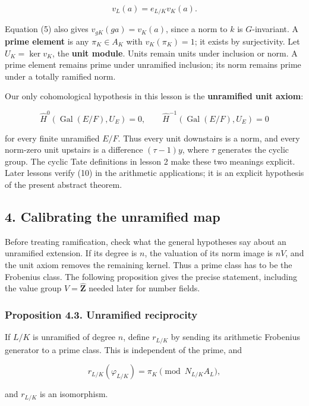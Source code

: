 \documentclass[11pt,a4paper]{article}
\begin{document}
\[
v_L(a)=e_{L/K}v_K(a).
\tag{9}
\]

Equation (5) also gives \(v_{gK}(ga)=v_K(a)\), since a norm to \(k\) is
\(G\)-invariant. A \textbf{prime element} is any \(\pi_K\in A_K\) with
\(v_K(\pi_K)=1\); it exists by surjectivity. Let \(U_K=\ker v_K\), the
\textbf{unit module}. Units remain units under inclusion or norm. A
prime element remains prime under unramified inclusion; its norm remains
prime under a totally ramified norm.

Our only cohomological hypothesis in this lesson is the
\textbf{unramified unit axiom}:

\[
\widehat H^0(\operatorname{Gal}(E/F),U_E)=0,
\qquad
\widehat H^{-1}(\operatorname{Gal}(E/F),U_E)=0
\tag{10}
\]

for every finite unramified \(E/F\). Thus every unit downstairs is a
norm, and every norm-zero unit upstairs is a difference \((\tau-1)y\),
where \(\tau\) generates the cyclic group. The cyclic Tate definitions
in lesson 2 make these two meanings explicit. Later lessons verify (10)
in the arithmetic applications; it is an explicit hypothesis of the
present abstract theorem.

\subsection{4. Calibrating the unramified
map}\label{calibrating-the-unramified-map}

Before treating ramification, check what the general hypotheses say
about an unramified extension. If its degree is \(n\), the valuation of
its norm image is \(nV\), and the unit axiom removes the remaining
kernel. Thus a prime class has to be the Frobenius class. The following
proposition gives the precise statement, including the value group
\(V=\widehat{\mathbf Z}\) needed later for number fields.

\subsubsection{Proposition 4.3. Unramified
reciprocity}\label{proposition-4.3.-unramified-reciprocity}

If \(L/K\) is unramified of degree \(n\), define \(r_{L/K}\) by sending
its arithmetic Frobenius generator to a prime class. This is independent
of the prime, and

\[
r_{L/K}(\varphi_{L/K})=\pi_K\pmod{N_{L/K}A_L},
\]

and \(r_{L/K}\) is an isomorphism.
\end{document}
